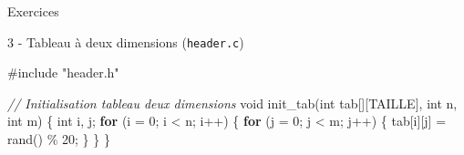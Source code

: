 \documentclass[
  10pt,
  french,
  ignorenonframetext,
  aspectratio=169,
]{beamer}
\newenvironment{Shaded}{}{}
\newcommand{\CommentTok}[1]{\textcolor[rgb]{0.38,0.63,0.69}{\textit{#1}}}
\newcommand{\ControlFlowTok}[1]{\textcolor[rgb]{0.00,0.44,0.13}{\textbf{#1}}}
\newcommand{\DataTypeTok}[1]{\textcolor[rgb]{0.56,0.13,0.00}{#1}}
\newcommand{\DecValTok}[1]{\textcolor[rgb]{0.25,0.63,0.44}{#1}}
\newcommand{\ImportTok}[1]{#1}
\newcommand{\NormalTok}[1]{#1}
\newcommand{\OperatorTok}[1]{\textcolor[rgb]{0.40,0.40,0.40}{#1}}
\newcommand{\PreprocessorTok}[1]{\textcolor[rgb]{0.74,0.48,0.00}{#1}}
\begin{document}
\begin{frame}[fragile]{Exercices}
\protect\hypertarget{exercices-7}{}
\begin{block}{3 - Tableau à deux dimensions (\texttt{header.c})}
\protect\hypertarget{tableau-uxe0-deux-dimensions-header.c}{}
\begin{Shaded}
\begin{Highlighting}[]
\PreprocessorTok{\#include }\ImportTok{"header.h"}

\CommentTok{// Initialisation tableau deux dimensions}
\DataTypeTok{void}\NormalTok{ init\_tab}\OperatorTok{(}\DataTypeTok{int}\NormalTok{ tab}\OperatorTok{[][}\NormalTok{TAILLE}\OperatorTok{],} \DataTypeTok{int}\NormalTok{ n}\OperatorTok{,} \DataTypeTok{int}\NormalTok{ m}\OperatorTok{)}
\OperatorTok{\{}
    \DataTypeTok{int}\NormalTok{ i}\OperatorTok{,}\NormalTok{ j}\OperatorTok{;}
    \ControlFlowTok{for} \OperatorTok{(}\NormalTok{i }\OperatorTok{=} \DecValTok{0}\OperatorTok{;}\NormalTok{ i }\OperatorTok{\textless{}}\NormalTok{ n}\OperatorTok{;}\NormalTok{ i}\OperatorTok{++)}
    \OperatorTok{\{}
        \ControlFlowTok{for} \OperatorTok{(}\NormalTok{j }\OperatorTok{=} \DecValTok{0}\OperatorTok{;}\NormalTok{ j }\OperatorTok{\textless{}}\NormalTok{ m}\OperatorTok{;}\NormalTok{ j}\OperatorTok{++)}
        \OperatorTok{\{}
\NormalTok{            tab}\OperatorTok{[}\NormalTok{i}\OperatorTok{][}\NormalTok{j}\OperatorTok{]} \OperatorTok{=}\NormalTok{ rand}\OperatorTok{()} \OperatorTok{\%} \DecValTok{20}\OperatorTok{;}
        \OperatorTok{\}}
    \OperatorTok{\}}
\OperatorTok{\}}
\end{Highlighting}
\end{Shaded}
\end{block}
\end{frame}
\end{document}
